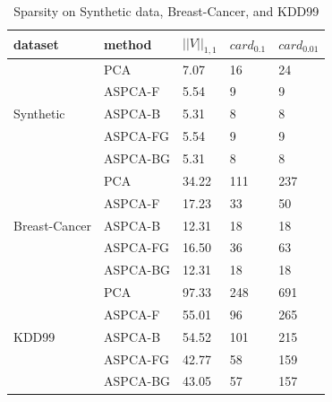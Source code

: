 \begin{table}
\small
\caption{Sparsity on Synthetic data, Breast-Cancer, and KDD99}
\begin{tabular}{|l|l|l|l|l|}
\hline
dataset                        & method   & $||V||_{1,1}$ & $card_{0.1}$ & $card_{0.01}$ \\ \hline
\multirow{5}{*}{Synthetic}     & PCA      & 7.07    & 16        & 24           \\ \cline{2-5}
		                       & ASPCA-F  & 5.54    & 9           & 9           \\ \cline{2-5}
		                       & ASPCA-B  & 5.31    & 8          & 8           \\ \cline{2-5}
		                       & ASPCA-FG & 5.54    & 9           & 9           \\ \cline{2-5}
		                       & ASPCA-BG & 5.31    & 8           & 8           \\ \hline
\multirow{5}{*}{Breast-Cancer} & PCA      & 34.22    & 111        & 237           \\ \cline{2-5}
		                       & ASPCA-F  & 17.23    & 33           & 50           \\ \cline{2-5}
		                       & ASPCA-B  & 12.31    & 18          & 18           \\ \cline{2-5}
		                       & ASPCA-FG & 16.50    & 36           & 63           \\ \cline{2-5}
		                       & ASPCA-BG & 12.31    & 18           & 18           \\ \hline
\multirow{5}{*}{KDD99}        & PCA      & 97.33    & 248          & 691           \\ \cline{2-5}
                               & ASPCA-F  & 55.01    & 96           & 265           \\ \cline{2-5}
                               & ASPCA-B  & 54.52    & 101          & 215           \\ \cline{2-5}
                               & ASPCA-FG & 42.77    & 58           & 159           \\ \cline{2-5}
                               & ASPCA-BG & 43.05    & 57           & 157           \\ \hline
\end{tabular}
\label{table:sparsity}
\end{table}

